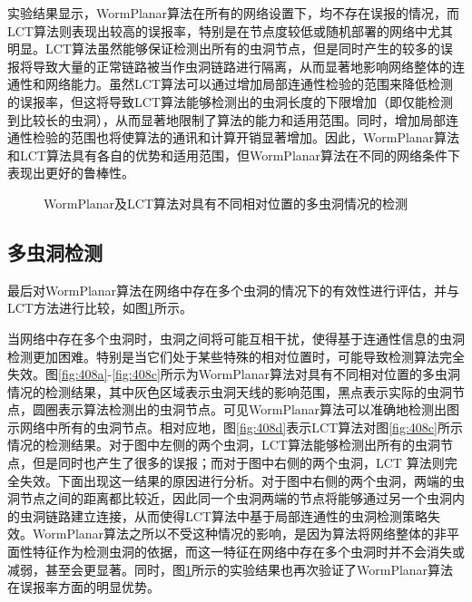 实验结果显示，WormPlanar算法在所有的网络设置下，均不存在误报的情况，而LCT算法则表现出较高的误报率，特别是在节点度较低或随机部署的网络中尤其明显。LCT算法虽然能够保证检测出所有的虫洞节点，但是同时产生的较多的误报将导致大量的正常链路被当作虫洞链路进行隔离，从而显著地影响网络整体的连通性和网络能力。虽然LCT算法可以通过增加局部连通性检验的范围来降低检测的误报率，但这将导致LCT算法能够检测出的虫洞长度的下限增加（即仅能检测到比较长的虫洞），从而显著地限制了算法的能力和适用范围。同时，增加局部连通性检验的范围也将使算法的通讯和计算开销显著增加。因此，WormPlanar算法和LCT算法具有各自的优势和适用范围，但WormPlanar算法在不同的网络条件下表现出更好的鲁棒性。
\begin{figure}[t]
  \centering
  \hspace{0.5em}%
  \hspace{0.5em}%
  \hspace{0.5em}%
  \caption{WormPlanar及LCT算法对具有不同相对位置的多虫洞情况的检测}
  \label{fig:408}
\end{figure}

\subsection{多虫洞检测}
最后对WormPlanar算法在网络中存在多个虫洞的情况下的有效性进行评估，并与LCT方法进行比较，如图\ref{fig:408}所示。

当网络中存在多个虫洞时，虫洞之间将可能互相干扰，使得基于连通性信息的虫洞检测更加困难。特别是当它们处于某些特殊的相对位置时，可能导致检测算法完全失效。图\ref{fig:408a}-\ref{fig:408c}所示为WormPlanar算法对具有不同相对位置的多虫洞情况的检测结果，其中灰色区域表示虫洞天线的影响范围，黑点表示实际的虫洞节点，圆圈表示算法检测出的虫洞节点。可见WormPlanar算法可以准确地检测出图示网络中所有的虫洞节点。相对应地，图\ref{fig:408d}表示LCT算法对图\ref{fig:408c}所示情况的检测结果。对于图中左侧的两个虫洞，LCT算法能够检测出所有的虫洞节点，但是同时也产生了很多的误报；而对于图中右侧的两个虫洞，LCT 算法则完全失效。下面出现这一结果的原因进行分析。对于图中右侧的两个虫洞，两端的虫洞节点之间的距离都比较近，因此同一个虫洞两端的节点将能够通过另一个虫洞内的虫洞链路建立连接，从而使得LCT算法中基于局部连通性的虫洞检测策略失效。WormPlanar算法之所以不受这种情况的影响，是因为算法将网络整体的非平面性特征作为检测虫洞的依据，而这一特征在网络中存在多个虫洞时并不会消失或减弱，甚至会更显著。同时，图\ref{fig:408}所示的实验结果也再次验证了WormPlanar算法在误报率方面的明显优势。
